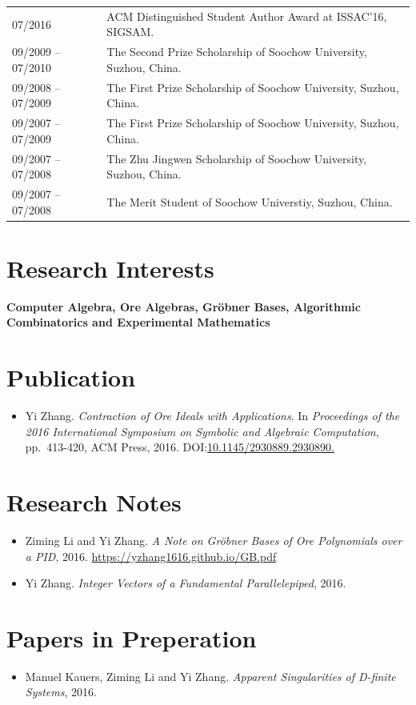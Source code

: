 \documentclass[a4paper,12pt]{article}
\begin{document}
\begin{tabular}{@{}p{1.4in}p{4in}}
07/2016               & ACM Distinguished Student Author Award at ISSAC'16, SIGSAM. \\
09/2009 -- 07/2010    & The Second Prize Scholarship of Soochow University, Suzhou, China.\\
09/2008 -- 07/2009    & The First Prize Scholarship of Soochow University, Suzhou, China. \\
09/2007 -- 07/2009    & The First Prize Scholarship of Soochow University, Suzhou, China. \\ 
09/2007 -- 07/2008    & The Zhu Jingwen Scholarship of Soochow University, Suzhou, China. \\
09/2007 -- 07/2008    & The Merit Student of Soochow Universtiy, Suzhou, China. 
\end{tabular}

\section*{\Large{Research Interests}}
{\bf Computer Algebra, Ore Algebras, Gr\"{o}bner Bases, Algorithmic Combinatorics and Experimental Mathematics}

\section*{\Large{Publication}}
\begin{itemize}
 \item Yi Zhang. {\em Contraction of Ore Ideals with Applications}. 
       In {\em Proceedings of the 2016 International Symposium on Symbolic and Algebraic Computation}, 
       pp.\ 413-420, ACM Press, 2016. DOI:\href{http://dl.acm.org/citation.cfm?id=2930890}{10.1145/2930889.2930890.}
\end{itemize}

\section*{\Large{Research Notes}}
\begin{itemize}
 \item Ziming Li and Yi Zhang. {\em A Note on Gr\"{o}bner Bases of Ore Polynomials over a PID}, 2016. 
 \url{https://yzhang1616.github.io/GB.pdf} 
 \item Yi Zhang. {\em Integer Vectors of a Fundamental Parallelepiped}, 2016.
\end{itemize}

\section*{\Large{Papers in Preperation}}
\begin{itemize}
 \item Manuel Kauers, Ziming Li and Yi Zhang. {\em Apparent Singularities of D-finite Systems}, 2016. 
\end{itemize}
\end{document}
